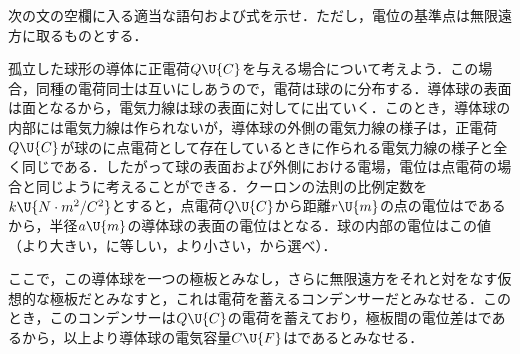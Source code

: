 \hspace{1zw}次の文の空欄に入る適当な語句および式を示せ．ただし，電位の基準点は無限遠方に取るものとする．
\par
\hspace{1zw}孤立した球形の導体に正電荷$Q\U{C}$を与える場合について考えよう．この場合，同種の電荷同士は互いにしあうので，電荷は球のに分布する．導体球の表面は面となるから，電気力線は球の表面に対してに出ていく．このとき，導体球の内部には電気力線は作られないが，導体球の外側の電気力線の様子は，正電荷$Q\U{C}$が球のに点電荷として存在しているときに作られる電気力線の様子と全く同じである．したがって球の表面および外側における電場，電位は点電荷の場合と同じように考えることができる．クーロンの法則の比例定数を$k\U{N\cdot m^2/C^2}$とすると，点電荷$Q\U{C}$から距離$r\U{m}$の点の電位はであるから，半径$a\U{m}$の導体球の表面の電位はとなる．球の内部の電位はこの値（より大きい，に等しい，より小さい，から選べ）．
\par
\hspace{1zw}ここで，この導体球を一つの極板とみなし，さらに無限遠方をそれと対をなす仮想的な極板だとみなすと，これは電荷を蓄えるコンデンサーだとみなせる．このとき，このコンデンサーは$Q\U{C}$の電荷を蓄えており，極板間の電位差はであるから，以上より導体球の電気容量$C\U{F}$はであるとみなせる．


